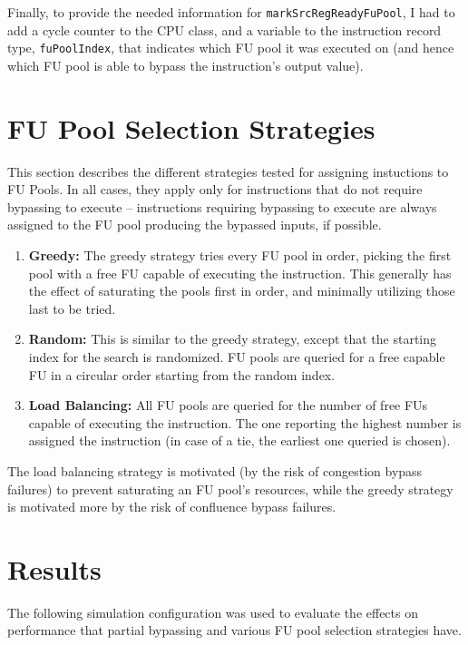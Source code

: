 \documentclass[11pt]{article}
\begin{document}
Finally, to provide the needed information for \texttt{markSrcRegReadyFuPool},
I had to add a cycle counter to the CPU class, and a variable to the
instruction record type, \texttt{fuPoolIndex}, that indicates which
FU pool it was executed on (and hence which FU pool is able to bypass
the instruction's output value).

\section{FU Pool Selection Strategies}

This section describes the different strategies tested for assigning
instuctions to FU Pools. In all cases, they apply only for
instructions that do not require bypassing to execute -- instructions
requiring bypassing to execute are always assigned to the FU pool
producing the bypassed inputs, if possible.

\begin{enumerate}
\item \textbf{Greedy:} The greedy strategy tries every FU pool in
  order, picking the first pool with a free FU capable of executing
  the instruction.  This generally has the effect of saturating the
  pools first in order, and minimally utilizing those last to be
  tried.
\item \textbf{Random:} This is similar to the greedy strategy, except
  that the starting index for the search is randomized. FU pools are
  queried for a free capable FU in a circular order starting from the
  random index.
\item \textbf{Load Balancing:} All FU pools are queried for the number
  of free FUs capable of executing the instruction. The one reporting
  the highest number is assigned the instruction (in case of a tie,
  the earliest one queried is chosen).
\end{enumerate}

The load balancing strategy is motivated (by the risk of congestion
bypass failures) to prevent saturating an FU pool's resources, while
the greedy strategy is motivated more by the risk of confluence bypass
failures.

\section{Results}

The following simulation configuration was used to evaluate the
effects on performance that partial bypassing and various FU pool
selection strategies have.
\end{document}
